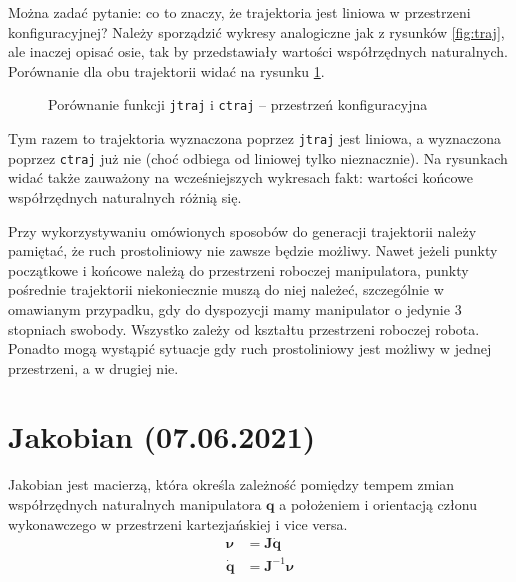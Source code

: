 \documentclass[11pt, a4paper]{article}
\newcommand{\vectorQ}{$\mathbf{q}$}
\begin{document}
Można zadać pytanie: co to znaczy, że trajektoria jest liniowa w przestrzeni konfiguracyjnej? Należy sporządzić wykresy analogiczne jak z rysunków \ref{fig:traj}, ale inaczej opisać osie, tak by przedstawiały wartości współrzędnych naturalnych. Porównanie dla obu trajektorii widać na rysunku \ref{fig:qspace}.
\begin{figure}[htbp!]
	\centering
	
	\hfill%
	
	\caption{Porównanie funkcji \texttt{jtraj} i \texttt{ctraj} -- przestrzeń konfiguracyjna \label{fig:qspace}}
\end{figure}

Tym razem to trajektoria wyznaczona poprzez \texttt{jtraj} jest liniowa, a wyznaczona poprzez \texttt{ctraj} już nie (choć odbiega od liniowej tylko nieznacznie). Na rysunkach widać także zauważony na wcześniejszych wykresach fakt: wartości końcowe współrzędnych naturalnych różnią się.

Przy wykorzystywaniu omówionych sposobów do generacji trajektorii należy pamiętać, że ruch prostoliniowy nie zawsze będzie możliwy. Nawet jeżeli punkty początkowe i końcowe należą do przestrzeni roboczej manipulatora, punkty pośrednie trajektorii niekoniecznie muszą do niej należeć, szczególnie w omawianym przypadku, gdy do dyspozycji mamy manipulator o jedynie 3 stopniach swobody. Wszystko zależy od kształtu przestrzeni roboczej robota. Ponadto mogą wystąpić sytuacje gdy ruch prostoliniowy jest możliwy w jednej przestrzeni, a w drugiej nie.

\newpage



%
%

\section{Jakobian (07.06.2021)}

Jakobian jest macierzą, która określa zależność pomiędzy tempem zmian współrzędnych naturalnych manipulatora \vectorQ{} a położeniem i orientacją członu wykonawczego w przestrzeni kartezjańskiej i vice versa.
\begin{align*}
\boldsymbol{\nu} & = \mathbf{J}\mathbf{\dot{q}} \\
\mathbf{\dot{q}} & = \mathbf{J}^{-1}\boldsymbol{\nu} \\
\end{align*}
\end{document}
